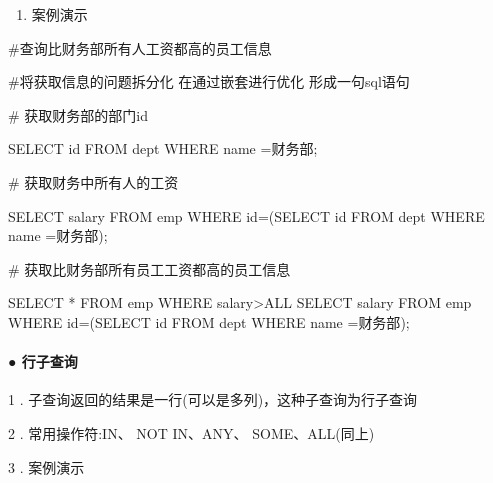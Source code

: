 \documentclass[
  letterpaper,
  DIV=11,
  numbers=noendperiod]{scrreprt}
\let\oldparagraph\paragraph
\renewcommand{\paragraph}[1]{\oldparagraph{#1}\mbox{}}
\newenvironment{Shaded}{\begin{snugshade}}{\end{snugshade}}
\newcommand{\KeywordTok}[1]{\textcolor[rgb]{0.00,0.23,0.31}{#1}}
\newcommand{\NormalTok}[1]{\textcolor[rgb]{0.00,0.23,0.31}{#1}}
\newcommand{\OperatorTok}[1]{\textcolor[rgb]{0.37,0.37,0.37}{#1}}
\newcommand{\StringTok}[1]{\textcolor[rgb]{0.13,0.47,0.30}{#1}}
\providecommand{\tightlist}{%
  \setlength{\itemsep}{0pt}\setlength{\parskip}{0pt}}\usepackage{longtable,booktabs,array}
\begin{document}
\begin{enumerate}
\def\labelenumi{\arabic{enumi}.}
\setcounter{enumi}{2}
\tightlist
\item
  案例演示
\end{enumerate}

\begin{Shaded}
\begin{Highlighting}[]
\NormalTok{\#查询比财务部所有人工资都高的员工信息}

\NormalTok{\#将获取信息的问题拆分化 在通过嵌套进行优化 形成一句sql语句}

\NormalTok{\# 获取财务部的部门id}

\KeywordTok{SELECT} \KeywordTok{id} \KeywordTok{FROM}\NormalTok{ dept }\KeywordTok{WHERE}\NormalTok{ name }\OperatorTok{=}\StringTok{\textquotesingle{}财务部\textquotesingle{}}\NormalTok{;}

\NormalTok{\# 获取财务中所有人的工资}

\KeywordTok{SELECT}\NormalTok{ salary }\KeywordTok{FROM}\NormalTok{ emp }\KeywordTok{WHERE} \KeywordTok{id}\OperatorTok{=}\NormalTok{(}\KeywordTok{SELECT} \KeywordTok{id} \KeywordTok{FROM}\NormalTok{ dept }\KeywordTok{WHERE}\NormalTok{ name }\OperatorTok{=}\StringTok{\textquotesingle{}财务部\textquotesingle{}}\NormalTok{);}

\NormalTok{\# 获取比财务部所有员工工资都高的员工信息}

\KeywordTok{SELECT} \OperatorTok{*} \KeywordTok{FROM}\NormalTok{ emp }\KeywordTok{WHERE}\NormalTok{ salary}\OperatorTok{\textgreater{}}\KeywordTok{ALL} \KeywordTok{SELECT}\NormalTok{ salary }\KeywordTok{FROM}\NormalTok{ emp }\KeywordTok{WHERE} \KeywordTok{id}\OperatorTok{=}\NormalTok{(}\KeywordTok{SELECT} \KeywordTok{id} \KeywordTok{FROM}\NormalTok{ dept }\KeywordTok{WHERE}\NormalTok{ name }\OperatorTok{=}\StringTok{\textquotesingle{}财务部\textquotesingle{}}\NormalTok{);}
\end{Highlighting}
\end{Shaded}

\hypertarget{ux884cux5b50ux67e5ux8be2}{%
\paragraph{● 行子查询}\label{ux884cux5b50ux67e5ux8be2}}

1 . 子查询返回的结果是一行(可以是多列)，这种子查询为行子查询

2 . 常用操作符:IN、 NOT IN、ANY、 SOME、ALL(同上)

3 . 案例演示
\end{document}
